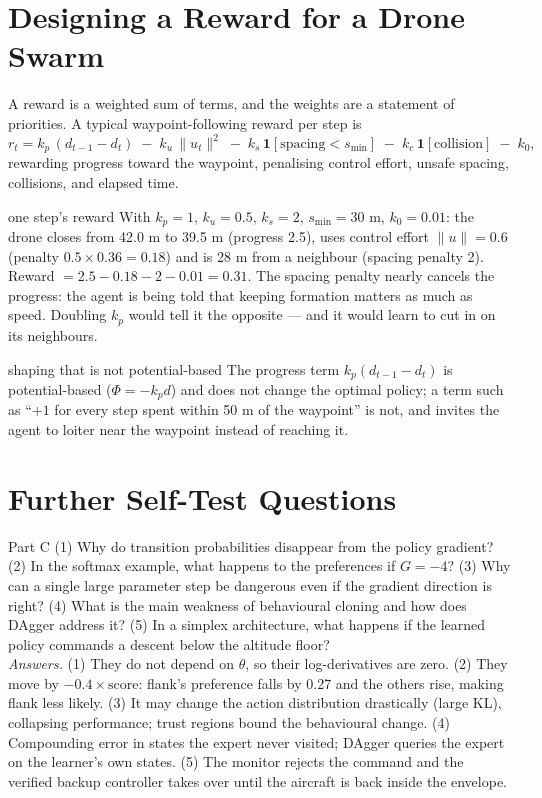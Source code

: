 \documentclass[11pt]{article}
\begin{document}
\section{Designing a Reward for a Drone Swarm}
A reward is a weighted sum of terms, and the weights are a statement of priorities. A typical waypoint-following reward per step is
\[r_t=k_p\,(d_{t-1}-d_t)\;-\;k_u\,\|u_t\|^2\;-\;k_s\,\mathbf 1[\text{spacing}<s_{\min}]\;-\;k_c\,\mathbf 1[\text{collision}]\;-\;k_0,\]
rewarding progress toward the waypoint, penalising control effort, unsafe spacing, collisions, and elapsed time.
\begin{example}{one step's reward}
With $k_p=1$, $k_u=0.5$, $k_s=2$, $s_{\min}=30$ m, $k_0=0.01$: the drone closes from 42.0 m to 39.5 m (progress 2.5), uses control effort $\|u\|=0.6$ (penalty $0.5\times0.36=0.18$) and is 28 m from a neighbour (spacing penalty 2). Reward $=2.5-0.18-2-0.01=0.31$. The spacing penalty nearly cancels the progress: the agent is being told that keeping formation matters as much as speed. Doubling $k_p$ would tell it the opposite --- and it would learn to cut in on its neighbours.
\end{example}
\begin{pitfall}{shaping that is not potential-based}
The progress term $k_p(d_{t-1}-d_t)$ is potential-based ($\Phi=-k_pd$) and does not change the optimal policy; a term such as ``$+1$ for every step spent within 50 m of the waypoint'' is not, and invites the agent to loiter near the waypoint instead of reaching it.
\end{pitfall}

\section{Further Self-Test Questions}
\begin{question}{Part C}
(1) Why do transition probabilities disappear from the policy gradient? (2) In the softmax example, what happens to the preferences if $G=-4$? (3) Why can a single large parameter step be dangerous even if the gradient direction is right? (4) What is the main weakness of behavioural cloning and how does DAgger address it? (5) In a simplex architecture, what happens if the learned policy commands a descent below the altitude floor?\\
\textit{Answers.} (1) They do not depend on $\theta$, so their log-derivatives are zero. (2) They move by $-0.4\times\text{score}$: flank's preference falls by 0.27 and the others rise, making flank less likely. (3) It may change the action distribution drastically (large KL), collapsing performance; trust regions bound the behavioural change. (4) Compounding error in states the expert never visited; DAgger queries the expert on the learner's own states. (5) The monitor rejects the command and the verified backup controller takes over until the aircraft is back inside the envelope.
\end{question}
\end{document}
